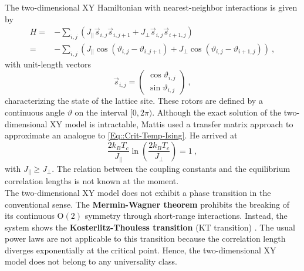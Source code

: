 	The two-dimensional XY Hamiltonian with nearest-neighbor interactions is given by
	\begin{equation}
		\begin{split}
			H =&- \sum_{i,j}^{} \left(J_\parallel \vec{s}_{i,j} \vec{s}_{i,j + 1} + J_\perp  \vec{s}_{i,j} \vec{s}_{i + 1,j} \right)   \\
			=&- \sum_{i,j}^{} \left(J_\parallel  \cos \left(\vartheta_{i,j} - \vartheta_{i, j+1} \right) + J_\perp  \cos \left(\vartheta_{i,j} - \vartheta_{i+1, j} \right) \right)	 ~,
		\end{split}
	\end{equation}
	with unit-length vectors
	\begin{equation}
		\vec{s}_{i, j} =	\left(\begin{array}{c}
			\cos \vartheta_{i, j} \\
			\sin \vartheta_{i, j}
		\end{array}\right) ~,
	\end{equation}
	characterizing the state of the lattice site. These rotors are defined by a continuous angle $\vartheta$ on the interval $[0, 2\pi)$. Although the exact solution of the two-dimensional XY model is intractable, Mattis \cite{mattis1984transfer} used a transfer matrix approach to approximate an analogue to \autoref{Eq::Crit-Temp-Ising}. He arrived at
	\begin{equation} \label{Eq::Crit-Temp-XY}
		\frac{2 k_B T_c}{J_\parallel} \ln \left(\frac{2 k_B T_c}{J_\perp}\right) =	1 ~, 
	\end{equation}
	with $J_\parallel \geq J_\perp$. The relation between the coupling constants and the equilibrium correlation lengths is not known at the moment. \\
	
	The two-dimensional XY model does not exhibit a phase transition in the conventional sense. The \textbf{Mermin-Wagner theorem} \cite{mermin1966absence} prohibits the breaking of its continuous $\text{O}(2)$ symmetry through short-range interactions. Instead, the system shows the \textbf{Kosterlitz-Thouless transition} (KT transition) \cite{JMKosterlitz_1973, berezinskii1971destruction}. The usual power laws are not applicable to this transition because the correlation length diverges exponentially at the critical point. Hence, the two-dimensional XY model does not belong to any universality class. \\
	
